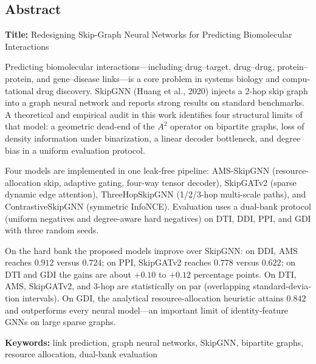 \clearpage
\begin{latin}
\chapter*{Abstract}

\noindent
\textbf{Title:} Redesigning Skip-Graph Neural Networks for Predicting Biomolecular Interactions

\vspace{0.8em}
Predicting biomolecular interactions---including drug--target, drug--drug, protein--protein, and gene--disease links---is a core problem in systems biology and computational drug discovery. SkipGNN (Huang et al., 2020) injects a 2-hop skip graph into a graph neural network and reports strong results on standard benchmarks. A theoretical and empirical audit in this work identifies four structural limits of that model: a geometric dead-end of the $A^2$ operator on bipartite graphs, loss of density information under binarization, a linear decoder bottleneck, and degree bias in a uniform evaluation protocol.

Four models are implemented in one leak-free pipeline: AMS-SkipGNN (resource-allocation skip, adaptive gating, four-way tensor decoder), SkipGATv2 (sparse dynamic edge attention), ThreeHopSkipGNN (1/2/3-hop multi-scale paths), and ContrastiveSkipGNN (symmetric InfoNCE). Evaluation uses a dual-bank protocol (uniform negatives and degree-aware hard negatives) on DTI, DDI, PPI, and GDI with three random seeds.

On the hard bank the proposed models improve over SkipGNN: on DDI, AMS reaches $0.912$ versus $0.724$; on PPI, SkipGATv2 reaches $0.778$ versus $0.622$; on DTI and GDI the gains are about $+0.10$ to $+0.12$ percentage points. On DTI, AMS, SkipGATv2, and 3-hop are statistically on par (overlapping standard-deviation intervals). On GDI, the analytical resource-allocation heuristic attains $0.842$ and outperforms every neural model---an important limit of identity-feature GNNs on large sparse graphs.

\vspace{0.8em}
\noindent\textbf{Keywords:} link prediction, graph neural networks, SkipGNN, bipartite graphs, resource allocation, dual-bank evaluation
\end{latin}
